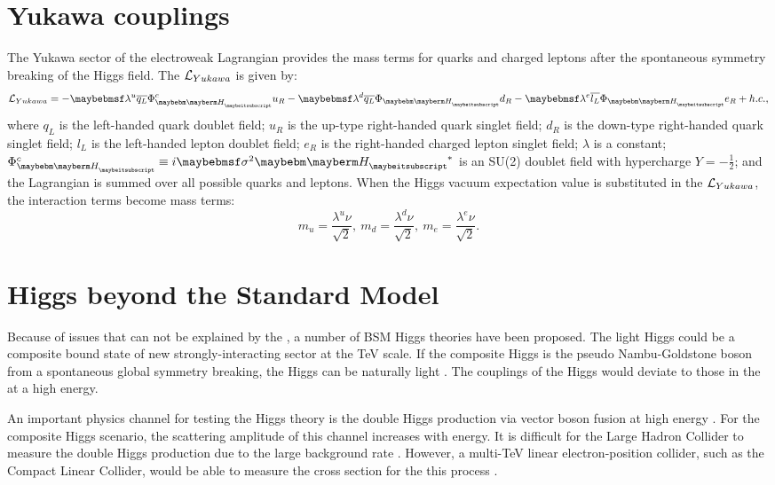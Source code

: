 \section{Yukawa couplings}

The Yukawa sector of the electroweak Lagrangian provides the mass terms for quarks and charged leptons after the spontaneous symmetry breaking of the Higgs field. The   $\operatorname{\mathcal{L}}_{Yukawa}$ is given by:
\begin{equation}
\Lagr_{Yukawa} = -\lambda^{u}\overline{q_L}\Phi_{\PH}^{c}u_R  - \lambda^{d}\overline{q_L}\Phi_{\PH}{d}_R - \lambda^{e}\overline{l_L}\Phi_{\PH}e_R + h.c. ,
\end{equation}
where $q_L$ is the left-handed quark doublet field; $u_R$ is the up-type right-handed quark singlet field;  $d_R$ is the down-type right-handed quark singlet field; $l_L$ is the left-handed lepton doublet field; $e_R$ is the right-handed charged lepton singlet field; $\lambda$ is a constant; $\Phi_{\PH}^{c} \equiv i \sigma^2{\PH}^*$ is an SU(2) doublet field with hypercharge $Y = -\frac{1}{2}$; and  the Lagrangian is summed over all possible quarks and leptons. When the Higgs vacuum expectation value is substituted in the $\operatorname{\mathcal{L}}_{Yukawa}$, the interaction terms become mass terms:
\begin{equation}
m_{u} = \frac{\lambda^u{\nu}}{\sqrt{2}},\ m_{d} = \frac{\lambda^d{\nu}}{\sqrt{2}},\ m_{e} = \frac{\lambda^e{\nu}}{\sqrt{2}}.
\end{equation}


\section{Higgs beyond the Standard Model}
\label{sec:theoryHiggsBSM}

Because of issues that can not be explained by the \SM, a number of BSM Higgs theories have been proposed. The light Higgs could be a composite bound state of new strongly-interacting sector at the TeV scale. If the composite Higgs is the pseudo Nambu-Goldstone boson from a spontaneous global symmetry breaking, the Higgs can be naturally light \cite{Kaplan:1983fs}.  The couplings of the Higgs would deviate to those in the \SM at a high energy.



An important physics channel for testing the Higgs theory is the double Higgs production via vector boson fusion at high energy \cite{Giudice:2007fh,Contino:2010mh,Contino:2013gna}. For the composite Higgs scenario, the scattering amplitude of this channel increases with energy. It is difficult for the Large Hadron Collider to measure the double Higgs production due to the large \SM background rate \cite{Contino:2010mh}. However, a multi-TeV linear electron-position collider, such as the Compact Linear Collider, would be able to measure the cross section for the this process \cite{Barger:2003rs}.

